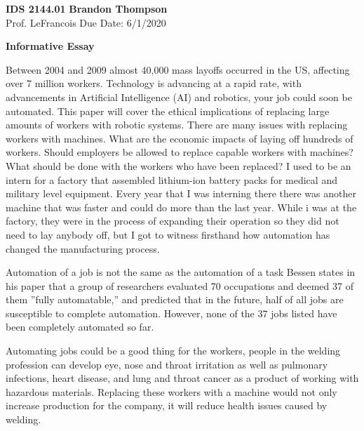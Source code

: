 \documentclass[12pt]{article}
\begin{document}
\noindent
\textbf{IDS 2144.01} \hfill \textbf{Brandon Thompson} \\
\normalsize Prof. LeFrancois \hfill Due Date: 6/1/2020 \\

\begin{center}
\textbf{Informative Essay}
\end{center}

	Between 2004 and 2009 almost 40,000 mass layoffs occurred in the US, affecting over
	7 million workers. \autocite{sucher} Technology is advancing at a rapid rate, with
	advancements in Artificial Intelligence (AI) and robotics, your job could soon be
	automated. This paper will cover the ethical implications of replacing large amounts
	of workers with robotic systems. There are many issues with replacing workers with
	machines. What are the economic impacts of laying off hundreds of workers. Should 
	employers be allowed to replace capable workers with machines? What should be done
	with the workers who have been replaced? I used to be an intern for a factory that
	assembled lithium-ion battery packs for medical and military level equipment. Every
	year that I was interning there there was another machine that was faster and could
	do more than the last year. While i was at the factory, they were in the process of
	expanding their operation so they did not need to lay anybody off, but I got to
	witness firsthand how automation has changed the manufacturing process.
	
	Automation of a job is not the same as the automation of a task Bessen states in his
	paper that a group of researchers  evaluated 70 occupations and deemed 37 of them
	''fully automatable,'' and predicted that in the future, half of all jobs are
	susceptible to complete automation. However, none of the 37 jobs listed have been
	completely automated so far. \autocite{bessen}

	Automating jobs could be a good thing for the workers, people in the welding profession
	can develop eye, nose and throat irritation as well as pulmonary infections, heart
	disease, and lung and throat cancer as a product of working with hazardous materials.
	\autocite{pham} Replacing these workers with a machine would not only increase production
	for the company, it will reduce health issues caused by welding.



	\newpage
	\printbibliography
\end{document}

